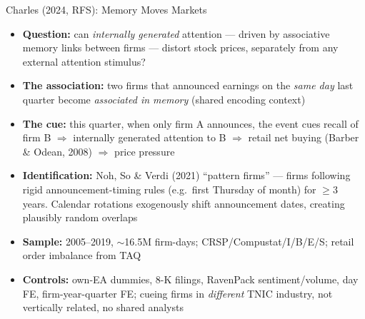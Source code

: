 \documentclass[aspectratio=169, 11pt]{beamer}
\begin{document}
\begin{frame}{Charles (2024, RFS): Memory Moves Markets}
\begin{itemize}
\item \textbf{Question:} can \emph{internally generated} attention --- driven by associative memory links between firms --- distort stock prices, separately from any external attention stimulus?
\item \textbf{The association:} two firms that announced earnings on the \emph{same day} last quarter become \emph{associated in memory} (shared encoding context)
\item \textbf{The cue:} this quarter, when only firm A announces, the event cues recall of firm B $\Rightarrow$ internally generated attention to B $\Rightarrow$ retail net buying (Barber \& Odean, 2008) $\Rightarrow$ price pressure
\item \textbf{Identification:} Noh, So \& Verdi (2021) ``pattern firms'' --- firms following rigid announcement-timing rules (e.g.\ first Thursday of month) for $\geq$3 years. Calendar rotations exogenously shift announcement dates, creating plausibly random overlaps
\item \textbf{Sample:} 2005--2019, $\sim$16.5M firm-days; CRSP/Compustat/I/B/E/S; retail order imbalance from TAQ
\item \textbf{Controls:} own-EA dummies, 8-K filings, RavenPack sentiment/volume, day FE, firm-year-quarter FE; cueing firms in \emph{different} TNIC industry, not vertically related, no shared analysts
\end{itemize}
\end{frame}
\end{document}
